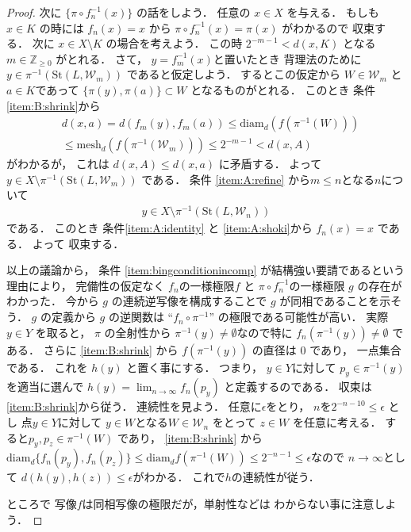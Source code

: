 \documentclass[leqno, a4paper, 12pt]{jsarticle}
\numberwithin{equation}{section}
\newcommand{\zz}{\mathbb{Z}}
\newcommand{\yocovfont}[1]{\mathscr{#1}}
\newcommand{\yost}[1]{\mathrm{St}(#1)}
\newcommand{\yodiam}{\mathrm{diam}}
\newcommand{\yomesh}{\mathrm{mesh}}
\begin{document}
\begin{proof}
次に
$\{\pi\circ f_{n}^{-1}(x)\}$
の話をしよう．
任意の
$x\in X$
を与える．
もしも
$x\in K$
の時には
$f_{n}(x)=x$
から
$\pi\circ f_{n}^{-1}(x)=\pi(x)$
がわかるので
収束する．
次に
$x\in X\setminus K$
の場合を考えよう．
この時
$2^{-m-1}<d(x, K)$
となる
$m\in \zz_{\ge 0}$
がとれる．
さて，
$y=f_{m}^{-1}(x)$と置いたとき
背理法のために
$y\in \pi^{-1}(\yost{L, \yocovfont{W}_{m}})$
であると仮定しよう．
するとこの仮定から
$W\in \yocovfont{W}_{m}$
と$a\in K$であって
$\{\pi(y), \pi(a)\}\subset W$
となるものがとれる．
このとき
条件
\ref{item:B:shrink}から
\begin{align*}
&d(x, a)=d(f_{m}(y), f_{m}(a))\le 
\yodiam_{d}(f(\pi^{-1}(W)))
\\
&\le 
\yomesh_{d}(f(\pi^{-1}(\yocovfont{W}_{m})))
\le 2^{-m-1}<d(x, A)
\end{align*}
がわかるが，
これは
$d(x, A)\le d(x, a)$
に矛盾する．
よって
$y\in X\setminus \pi^{-1}(\yost{L, \yocovfont{W}_{m}})$
である．
条件
\ref{item:A:refine}
から$m\le n$となる$n$について
\begin{align}
y\in X\setminus \pi^{-1}(\yost{L, \yocovfont{W}_{n}})
\end{align}
である．
このとき
条件\ref{item:A:identity}
と
\ref{item:A:shoki}から
$f_{n}(x)=x$
である．
よって
収束する．

以上の議論から，
条件
\ref{item:bingconditionincomp}
が結構強い要請であるという理由により，
完備性の仮定なく
$f_{n}$の一様極限$f$
と
$\pi\circ f_{n}^{-1}$の一様極限
$g$
の存在がわかった．
今から
$g$
の連続逆写像を構成することで
$g$
が同相であることを示そう．
$g$
の定義から
$g$
の逆関数は
``$f_{n}\circ \pi^{-1}$''
の極限である可能性が高い．
実際
$y\in Y$
を取ると，
$\pi$
の全射性から
$\pi^{-1}(y)\neq \emptyset$なので特に
$f_{n}(\pi^{-1}(y))\neq \emptyset$
である．
さらに
\ref{item:B:shrink}
から
$f(\pi^{-1}(y))$
の直径は
$0$
であり，
一点集合である．
これを
$h(y)$
と置く事にする．
つまり，
$y\in Y$に対して
$p_{y}\in \pi^{-1}(y)$を適当に選んで
$h(y)=\lim_{n\to \infty}f_{n}(p_{y})$
と定義するのである．
収束は\ref{item:B:shrink}から従う．
連続性を見よう．
任意に$\epsilon$をとり，
$n$を$2^{-n-10}\le \epsilon$
とし
点$y\in Y$に対して
$y\in W$となる$W\in \yocovfont{W}_{n}$
をとって
$z\in W$
を任意に考える．
すると$p_{y}, p_{z}\in \pi^{-1}(W)$
であり，
\ref{item:B:shrink}
から
$\yodiam_{d}\{f_{n}(p_{y}), f_{n}(p_{z})\}\le 
\yodiam_{d}f(\pi^{-1}(W))\le 2^{-n-1}\le \epsilon$なので
$n\to \infty$として
$d(h(y), h(z))\le \epsilon$がわかる．
これで$h$の連続性が従う．

ところで
写像$f$は同相写像の極限だが，単射性などは
わからない事に注意しよう．


\end{proof}
\end{document}
